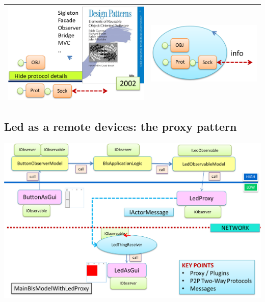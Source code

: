 \documentclass[10pt,a4paper,openright,twoside]{C:/Didattica/git/lab2014Bo/it.unibo.iss2015intro/docsInternal/contents/llncs}
\begin{document}
 \medskip 
\begin{tabular}{|c|c|}
\hline 
\includegraphics[scale = 0.6]{img/obj1.png} &  \includegraphics[scale = 0.7]{img/obj2.png}\\
\hline 
\end{tabular}
\medskip 
 

\subsection{Led as a remote devices: the proxy pattern }

\medskip 
\includegraphics[scale = 0.5]{img/bls18/bls18ObjLedRemote.png}
\end{document}
